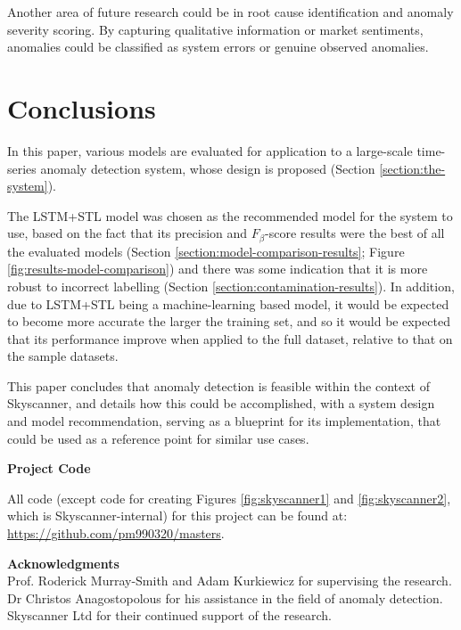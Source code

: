 \documentclass{mpaper}
\begin{document}
Another area of future research could be in root cause identification and anomaly severity scoring. By capturing qualitative information or market sentiments, anomalies could be classified as system errors or genuine observed anomalies.

\section{Conclusions}
\label{section:conclusions}

In this paper, various models are evaluated for application to a large-scale time-series anomaly detection system, whose design is proposed (Section \ref{section:the-system}).

The LSTM+STL model was chosen as the recommended model for the system to use, based on the fact that its precision and $F_\beta$-score results were the best of all the evaluated models (Section \ref{section:model-comparison-results}; Figure \ref{fig:results-model-comparison}) and there was some indication that it is more robust to incorrect labelling (Section \ref{section:contamination-results}). In addition, due to LSTM+STL being a machine-learning based model, it would be expected to become more accurate the larger the training set, and so it would be expected that its performance improve when applied to the full dataset, relative to that on the sample datasets.

This paper concludes that anomaly detection is feasible within the context of Skyscanner, and details how this could be accomplished, with a system design and model recommendation, serving as a blueprint for its implementation, that could be used as a reference point for similar use cases.


\vskip8pt \noindent
{\bf Project Code}

All code (except code for creating Figures \ref{fig:skyscanner1} and \ref{fig:skyscanner2}, which is Skyscanner-internal) for this project can be found at: \\ \url{https://github.com/pm990320/masters}.


\vskip8pt \noindent
{\bf Acknowledgments}
\\Prof. Roderick Murray-Smith and Adam Kurkiewicz for supervising the research. \\ Dr Christos Anagostopolous for his assistance in the field of anomaly detection. \\ Skyscanner Ltd for their continued support of the research.




\end{document}
